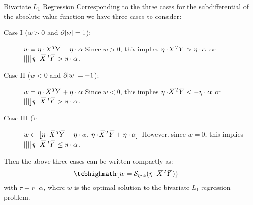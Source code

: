 \begin{frame}{Bivariate $L_1$ Regression}
Corresponding to the three cases for the subdifferential of the absolute
value function 
we have three cases to consider: 
\begin{description}
    
    \item[Case I ($w>0$ and $\partial\abs{w} = 1$):]%
$
        w   = \eta \cdot \mX^T \mY - \eta \cdot \alpha
$ 
    Since $w > 0$, this implies 
    $\eta \cdot \mX^T \mY > \eta \cdot \alpha$ or $\abs[\big]{\eta \cdot
    \mX^T\mY} > \eta \cdot \alpha$.

\item[Case II ($w<0$ and $\partial\abs{w} = -1$):]%
        $w  = \eta \cdot \mX^T \mY + \eta \cdot \alpha$ 
    Since $w < 0$, this implies 
    $\eta \cdot \mX^T \mY < - \eta \cdot \alpha$ or 
    $\abs[\big]{\eta \cdot \mX^T \mY} > \eta \cdot \alpha$.

\item[Case III ():]
$        w  \in\; \lB[\eta \cdot \mX^T \mY - \eta \cdot \alpha, \; 
        \eta \cdot \mX^T\mY + \eta \cdot \alpha\rB]
$
    However, since $w=0$, this implies
    $\abs[\big]{\eta \cdot \mX^T \mY} \le \eta \cdot \alpha$. 

\end{description}
%
Then the above three cases can be written compactly as:
\begin{align}
    \tcbhighmath{
    w = \cS_{\eta \cdot \alpha}(\eta \cdot \mX^T \mY)}
    \label{eq:reg:linear:l1_bi_optw}
\end{align}
with $\tau = \eta \cdot \alpha$, where $w$ is the optimal solution to the
bivariate $L_1$ regression problem. %
\end{frame}
%

